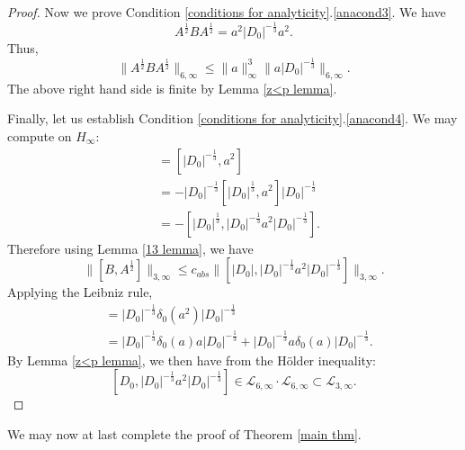\begin{proof}
        Now we prove Condition \ref{conditions for analyticity}.\eqref{anacond3}. We have
        $$A^{\frac12}BA^{\frac12} = a^2|D_0|^{-\frac13}a^2.$$
        Thus,
        $$\|A^{\frac12}BA^{\frac12}\|_{6,\infty}\leq\|a\|_{\infty}^3\|a|D_0|^{-\frac13}\|_{6,\infty}.$$
        The above right hand side is finite by Lemma \ref{z<p lemma}.

        Finally, let us establish Condition \ref{conditions for analyticity}.\eqref{anacond4}. We may compute on $H_\infty$:
        \begin{align*}
            [B,A^{\frac12}] &= [|D_0|^{-\frac13},a^2]\\
                            &= -|D_0|^{-\frac13}[|D_0|^{\frac13},a^2]|D_0|^{-\frac13}\\
                            &= -[|D_0|^{\frac13},|D_0|^{-\frac13}a^2|D_0|^{-\frac13}].
        \end{align*}
        Therefore using Lemma \ref{13 lemma}, we have
        $$\|[B,A^{\frac12}]\|_{3,\infty}\leq c_{abs}\|[|D_0|,|D_0|^{-\frac13}a^2|D_0|^{-\frac13}]\|_{3,\infty}.$$
        Applying the Leibniz rule,
        \begin{align*}
            [|D_0|,|D_0|^{-\frac13}a^2|D_0|^{-\frac13}] &= |D_0|^{-\frac13}\delta_0(a^2)|D_0|^{-\frac13}\\
                                                        &= |D_0|^{-\frac13}\delta_0(a)a|D_0|^{-\frac13}+|D_0|^{-\frac13}a\delta_0(a)|D_0|^{-\frac13}.
        \end{align*}
        By Lemma \ref{z<p lemma}, we then have from the H\"older inequality:
        $$[D_0,|D_0|^{-\frac13}a^2|D_0|^{-\frac13}]\in\mathcal{L}_{6,\infty}\cdot\mathcal{L}_{6,\infty}\subset\mathcal{L}_{3,\infty}.$$
    \end{proof}
    
    We may now at last complete the proof of Theorem \ref{main thm}.
    
